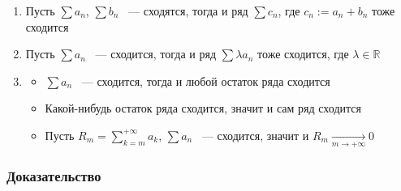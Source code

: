 \documentclass{article}
\begin{document}
                \begin{enumerate}
            
                    \item Пусть $\sum a_n$, $\sum b_n$ ~--- сходятся, тогда и ряд $\sum c_n$, где $c_n := a_n + b_n$ тоже сходится
                
                    \item Пусть $\sum a_n$ ~--- сходится, тогда и ряд $\sum \lambda a_n$ тоже сходится, где $\lambda \in \mathbb{R}$
                
                    \item 
                
                        \begin{itemize}
                    
                            \item $\sum a_n$ ~--- сходится, тогда и любой остаток ряда сходится
                        
                            \item Какой-нибудь остаток ряда сходится, значит и сам ряд сходится
                        
                            \item Пусть $R_m = \sum\limits_{k = m}^{+\infty} a_k$, $\sum a_n$ ~--- сходится, значит и $R_m \xrightarrow[m \rightarrow +\infty]{} 0$
                        
                        \end{itemize}
                    
                \end{enumerate}
            
            \subsubsection{Доказательство}
            
\end{document}
